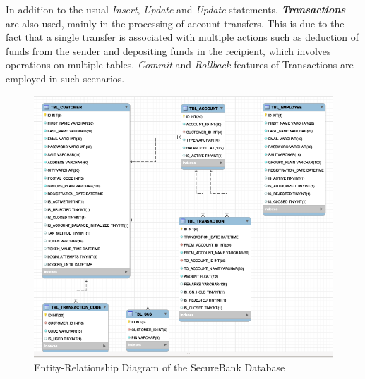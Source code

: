 In addition to the usual \textit{Insert}, \textit{Update} and \textit{Update} statements, \textit{\textbf{Transactions}} are also used, mainly in the processing of account transfers. This is due to the fact that a single transfer is associated with multiple actions such as deduction of funds from the sender and depositing funds in the recipient, which involves operations on multiple tables. \textit{Commit} and \textit{Rollback} 
features of Transactions are employed in such scenarios. 

\begin{figure}[ht]
	\centering
	\includegraphics[width=0.9\linewidth]{figures/db_schema.png}
	\caption{Entity-Relationship Diagram of the SecureBank Database}
	\label{fig:db_schema}
\end{figure}

\clearpage